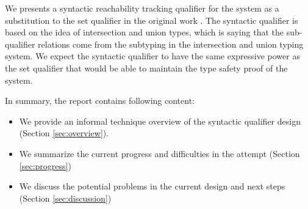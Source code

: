 We presents a syntactic reachability tracking qualifier for the \langstar system as a substitution to the set qualifier in the original work \cite{reachability-paper}. The syntactic qualifier is based on the idea of intersection and union types, which is saying that the sub-qualifier relations come from the subtyping in the intersection and union typing system. We expect the syntactic qualifier to have the same expressive power as the set qualifier that would be able to maintain the type safety proof of the \langstar system.

In summary, the report contains following content: 
\begin{itemize}
    \item We provide an informal technique overview of the syntactic qualifier design (Section \ref{sec:overview}).
    \item We summarize the current progress and difficulties in the attempt (Section \ref{sec:progress}) 
    \item We discuss the potential problems in the current design and next steps (Section \ref{sec:discussion}) 
\end{itemize}




